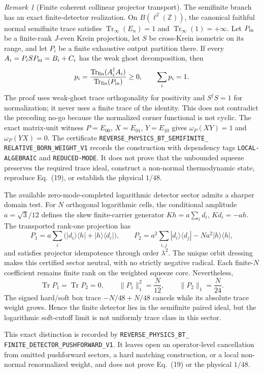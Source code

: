 \documentclass[11pt]{article}
\theoremstyle{definition}
\theoremstyle{remark}
\newtheorem{remark}[theorem]{Remark}
\begin{document}
\begin{remark}[Finite coherent collinear projector transport]
The semifinite branch has an exact finite-detector realization.  On
$B(\ell^2(\mathbb Z))$, the canonical faithful normal semifinite trace satisfies
$\operatorname{Tr}_{\!\infty}(E_n)=1$ and
$\operatorname{Tr}_{\!\infty}(1)=+\infty$.  Let $P_{\rm in}$ be a finite-rank
$J$-even Krein projection, let $S$ be cross-Krein isometric on its range, and
let $P_i$ be a finite exhaustive output partition there.  If every
$A_i=P_iSP_{\rm in}=B_i+C_i$ has the weak ghost decomposition, then
\[
 p_i=\frac{\operatorname{Tr}_{\rm fin}(A_i^\dagger A_i)}
 {\operatorname{Tr}_{\rm fin}(P_{\rm in})}\geq0,
 \qquad \sum_i p_i=1.
\]
The proof uses weak-ghost trace orthogonality for positivity and
$S^\dagger S=1$ for normalization; it never uses a finite trace of the
identity.  This does not contradict the preceding no-go because the normalized
corner functional is not cyclic.  The exact matrix-unit witness
$P=E_{00}$, $X=E_{01}$, $Y=E_{10}$ gives
$\omega_P(XY)=1$ and $\omega_P(YX)=0$.  The certificate
\texttt{REVERSE\_PHYSICS\_BT\_SEMIFINITE\_}
\allowbreak\texttt{RELATIVE\_BORN\_WEIGHT\_V1} records the construction with
dependency tags \texttt{LOCAL-ALGEBRAIC} and \texttt{REDUCED-MODE}.  It does
not prove that the unbounded squeeze preserves the required trace ideal,
construct a non-normal thermodynamic state, reproduce Eq.~(19), or establish
the physical $1/48$.

The available zero-mode-completed logarithmic detector sector admits a sharper
domain test.  For $N$ orthogonal logarithmic cells, the conditional amplitude
$a=\sqrt3/12$ defines the skew finite-carrier generator
$Kh=a\sum_i d_i$, $Kd_i=-ah$.  The transported rank-one projection has
\[
 P_1=a\sum_i\bigl(|d_i\rangle\langle h|+|h\rangle\langle d_i|\bigr),
 \qquad
 P_2=a^2\sum_{i,j}|d_i\rangle\langle d_j|-Na^2|h\rangle\langle h|,
\]
and satisfies projector idempotence through order $\lambda^2$.  The unique
orbit dressing makes this certified sector neutral, with no strictly negative
radical.  Each finite-$N$ coefficient remains finite rank on the weighted
squeeze core.  Nevertheless,
\[
 \operatorname{Tr} P_1=\operatorname{Tr} P_2=0,
 \qquad
 \|P_1\|_1^2=\frac{N}{12},
 \qquad
 \|P_2\|_1=\frac{N}{24}.
\]
The signed hard/soft box trace $-N/48+N/48$ cancels while its absolute trace
weight grows.  Hence the finite detector lies in the semifinite paired ideal,
but the logarithmic soft-cutoff limit is not uniformly trace class in this
sector.\par\noindent This exact distinction is recorded by
\texttt{REVERSE\_PHYSICS\_BT\_}\allowbreak
\texttt{FINITE\_DETECTOR\_}\allowbreak\texttt{PUSHFORWARD\_V1}.  It leaves
open an operator-level
cancellation from omitted pushforward sectors, a hard matching construction,
or a local non-normal renormalized weight, and does not prove Eq.~(19) or the
physical $1/48$.


\end{remark}
\end{document}
